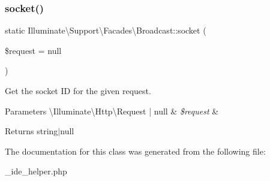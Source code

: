 \subsubsection{\texorpdfstring{socket()}{socket()}}
{\footnotesize\ttfamily static Illuminate\textbackslash{}\+Support\textbackslash{}\+Facades\textbackslash{}\+Broadcast\+::socket (\begin{DoxyParamCaption}\item[{}]{\$request = {\ttfamily null} }\end{DoxyParamCaption})\hspace{0.3cm}{\ttfamily [static]}}

Get the socket ID for the given request.


\begin{DoxyParams}[1]{Parameters}
\textbackslash{}\+Illuminate\textbackslash{}\+Http\textbackslash{}\+Request | null & {\em \$request} & \\
\hline
\end{DoxyParams}
\begin{DoxyReturn}{Returns}
string$\vert$null 
\end{DoxyReturn}


The documentation for this class was generated from the following file\+:\begin{DoxyCompactItemize}
\item 
\+\_\+ide\+\_\+helper.\+php\end{DoxyCompactItemize}
